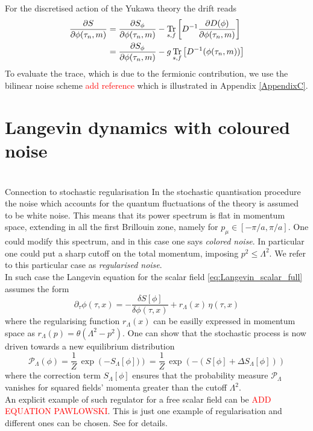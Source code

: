 For the discretised action of the Yukawa theory the drift reads
\begin{equation}
    \begin{aligned}
        \frac{\partial S}{\partial \phi(\tau_n,m)} &= \frac{\partial S_\phi}{\partial \phi(\tau_n, m)} - \underset{s,f}{\operatorname{\text{Tr}}} \left[D^{-1} \frac{\partial D(\phi)}{\partial \phi(\tau_n, m)}\right] \\
        &= \frac{\partial S_\phi}{\partial \phi(\tau_n, m)} - g \, \underset{s,f}{\operatorname{\text{Tr}}} \left[D^{-1}(\phi(\tau_n,m))\right]
    \end{aligned}
    \label{eq:drift_continuum_full_theory}
\end{equation}
To evaluate the trace, which is due to the fermionic contribution, we use the bilinear noise scheme \textcolor{red}{add reference} which is illustrated in Appendix \ref{AppendixC}.



\section{Langevin dynamics with coloured noise}
\label{sec:coloured_noise}
 \\
Connection to stochastic regularisation \cite{}
In the stochastic quantisation procedure the noise which accounts for the quantum fluctuations of the theory is assumed to be white noise. This means that its power spectrum is flat in momentum space, extending in all the first Brillouin zone, namely for $p_\mu \in [-\pi/a, \pi/a]$. One could modify this spectrum, and in this case one says \emph{colored noise}. In particular one could put a sharp cutoff on the total momentum, imposing $p^2 \leq \Lambda^2$. We refer to this particular case as \emph{regularised noise}. \\
In such case the Langevin equation for the scalar field \eqref{eq:Langevin_scalar_full} assumes the form
\begin{equation*}
    \partial_\tau \phi(\tau, x) = - \frac{\delta S[\phi]}{\delta \phi (\tau, x)} + r_\Lambda (x) \, \eta (\tau, x)
    \label{eq:Langevin_scalar_regularised}
\end{equation*}
where the regularising function $r_\Lambda(x)$ can be easilly expressed in momentum space as $r_\Lambda(p) = \theta(\Lambda^2 - p^2)$. One can show \cite{Pawlowski2017CoolingNoise} that the stochastic process is now driven towards a new equilibrium distribution
\begin{equation}
    \mathcal{P}_\Lambda(\phi) = \frac{1}{Z} \, \exp\left(-S_\Lambda[\phi])\right) = \frac{1}{Z} \, \exp\left(-(S[\phi] + \Delta S_\Lambda[\phi])\right)
    \label{eq:probability_field_configuration_regularised}
\end{equation}
where the correction term $S_\Lambda[\phi]$ ensures that the probability measure $\mathcal{P}_\Lambda$ vanishes for squared fields' momenta greater than the cutoff $\Lambda^2$. \\
An explicit example of such regulator for a free scalar field can be \textcolor{red}{ADD EQUATION PAWLOWSKI}.
This is just one example of regularisation and different ones can be chosen. See \cite{Pawlowski2017CoolingNoise} for details.


